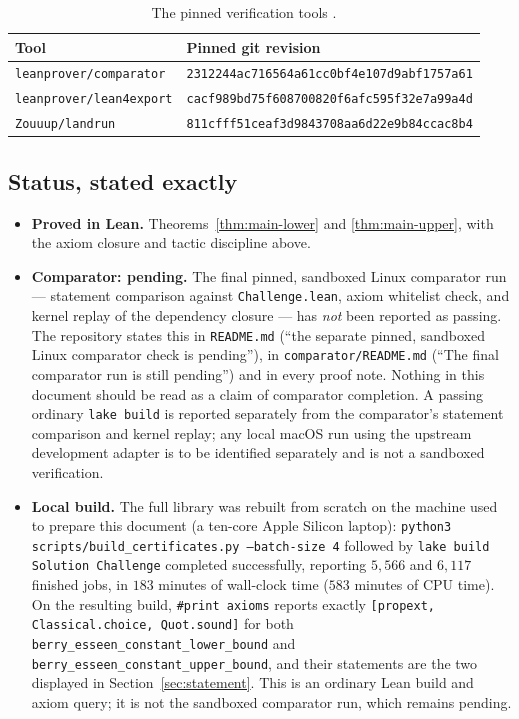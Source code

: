\documentclass[10pt,a4paper]{article}
\theoremstyle{plain}
\theoremstyle{definition}
\newcommand{\lean}[1]{\texttt{#1}}
\newcommand{\file}[1]{\texttt{#1}}
\begin{document}
\begin{table}[ht]
\centering
\begin{tabular}{@{}ll@{}}
\toprule
Tool & Pinned git revision \\
\midrule
\file{leanprover/comparator} & \texttt{2312244ac716564a61cc0bf4e107d9abf1757a61} \\
\file{leanprover/lean4export} & \texttt{cacf989bd75f608700820f6afc595f32e7a99a4d} \\
\file{Zouuup/landrun} & \texttt{811cfff51ceaf3d9843708aa6d22e9b84ccac8b4} \\
\bottomrule
\end{tabular}
\caption{The pinned verification tools \cite{Comparator2026}.}
\label{tab:pins}
\end{table}

\subsection{Status, stated exactly}

\begin{itemize}[leftmargin=2.2em]
\item \textbf{Proved in Lean.} Theorems~\ref{thm:main-lower} and
  \ref{thm:main-upper}, with the axiom closure and tactic discipline above.
\item \textbf{Comparator: pending.} The final pinned, sandboxed Linux
  comparator run --- statement comparison against \file{Challenge.lean}, axiom
  whitelist check, and kernel replay of the dependency closure --- has
  \emph{not} been reported as passing. The repository states this in
  \file{README.md} (``the separate pinned, sandboxed Linux comparator check is
  pending''), in \file{comparator/README.md} (``The final comparator run is
  still pending'') and in every proof note. Nothing in this document should be
  read as a claim of comparator completion. A passing ordinary
  \lean{lake build} is reported separately from the comparator's statement
  comparison and kernel replay; any local macOS run using the upstream
  development adapter is to be identified separately and is not a sandboxed
  verification.
\item \textbf{Local build.} The full library was rebuilt from scratch on the
  machine used to prepare this document (a ten-core Apple Silicon laptop):
  \texttt{python3 scripts/build\_certificates.py --batch-size 4} followed by
  \texttt{lake build Solution Challenge} completed successfully, reporting
  $5{,}566$ and $6{,}117$ finished jobs, in $183$ minutes of wall-clock time
  ($583$ minutes of CPU time). On the resulting build,
  \texttt{\#print axioms} reports exactly
  \lean{[propext, Classical.choice, Quot.sound]} for both
  \lean{berry\_esseen\_constant\_lower\_bound} and
  \lean{berry\_esseen\_constant\_upper\_bound}, and their statements are the two
  displayed in Section~\ref{sec:statement}. This is an ordinary Lean build and
  axiom query; it is not the sandboxed comparator run, which remains pending.
\end{itemize}
\end{document}
